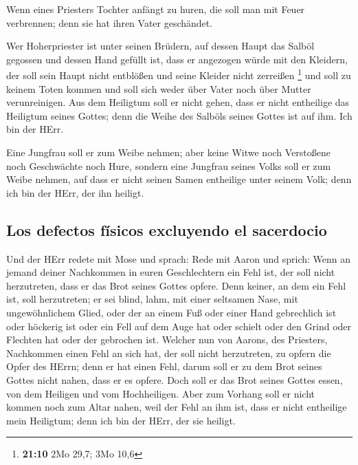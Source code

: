  Wenn eines Priesters Tochter anfängt zu huren, die soll
man mit Feuer verbrennen; denn sie hat ihren Vater geschändet.

 Wer Hoherpriester ist unter seinen Brüdern, auf dessen
Haupt das Salböl gegossen und dessen Hand gefüllt ist, dass er angezogen
würde mit den Kleidern, der soll sein Haupt nicht entblößen und seine
Kleider nicht zerreißen \footnote{\textbf{21:10} 2Mo 29,7; 3Mo 10,6}
 und soll zu keinem Toten kommen und soll sich weder über
Vater noch über Mutter verunreinigen.  Aus dem Heiligtum
soll er nicht gehen, dass er nicht entheilige das Heiligtum seines
Gottes; denn die Weihe des Salböls seines Gottes ist auf ihm. Ich bin
der HErr.

 Eine Jungfrau soll er zum Weibe nehmen; 
aber keine Witwe noch Verstoßene noch Geschwächte noch Hure, sondern
eine Jungfrau seines Volks soll er zum Weibe nehmen,  auf
dass er nicht seinen Samen entheilige unter seinem Volk; denn ich bin
der HErr, der ihn heiligt.

\hypertarget{los-defectos-fuxedsicos-excluyendo-el-sacerdocio}{%
\subsection{Los defectos físicos excluyendo el
sacerdocio}\label{los-defectos-fuxedsicos-excluyendo-el-sacerdocio}}

 Und der HErr redete mit Mose und sprach: 
Rede mit Aaron und sprich: Wenn an jemand deiner Nachkommen in euren
Geschlechtern ein Fehl ist, der soll nicht herzutreten, dass er das Brot
seines Gottes opfere.  Denn keiner, an dem ein Fehl ist,
soll herzutreten; er sei blind, lahm, mit einer seltsamen Nase, mit
ungewöhnlichem Glied,  oder der an einem Fuß oder einer
Hand gebrechlich ist  oder höckerig ist oder ein Fell auf
dem Auge hat oder schielt oder den Grind oder Flechten hat oder der
gebrochen ist.  Welcher nun von Aarons, des Priesters,
Nachkommen einen Fehl an sich hat, der soll nicht herzutreten, zu opfern
die Opfer des HErrn; denn er hat einen Fehl, darum soll er zu dem Brot
seines Gottes nicht nahen, dass er es opfere.  Doch soll
er das Brot seines Gottes essen, von dem Heiligen und vom Hochheiligen.
 Aber zum Vorhang soll er nicht kommen noch zum Altar
nahen, weil der Fehl an ihm ist, dass er nicht entheilige mein
Heiligtum; denn ich bin der HErr, der sie heiligt.

